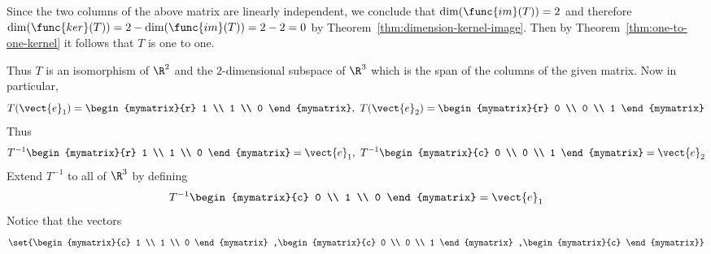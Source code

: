 \begin{solution}
Since the two columns of the above matrix are linearly independent, we conclude that $\dim(\func{im}(T)) = 2$ and therefore $\dim(\func{ker}(T)) = 2 - \dim(\func{im}(T)) = 2-2 = 0$ by Theorem~\ref{thm:dimension-kernel-image}. Then by Theorem~\ref{thm:one-to-one-kernel} it follows that $T$ is one to one.

Thus $T$ is an isomorphism of $\R^{2}$ and the $2$-dimensional subspace of $\R^{3}$ which is the
span of the columns of the given matrix. Now in particular,
\begin{equation*}
T(\vect{e}_{1})=\begin{mymatrix}{r}
1 \\
1 \\
0
\end{mymatrix} ,\ T(\vect{e}_{2})=\begin{mymatrix}{r}
0 \\
0 \\
1
\end{mymatrix}
\end{equation*}
Thus
\begin{equation*}
T^{-1}\begin{mymatrix}{r}
1 \\
1 \\
0
\end{mymatrix} =\vect{e}_{1},\ T^{-1}\begin{mymatrix}{c}
0 \\
0 \\
1
\end{mymatrix} =\vect{e}_{2}
\end{equation*}
Extend $T^{-1}$ to all of $\R^{3}$ by defining
\begin{equation*}
T^{-1}\begin{mymatrix}{c}
0 \\
1 \\
0
\end{mymatrix} =\vect{e}_{1}
\end{equation*}
Notice that the vectors
\begin{equation*}
\set{\begin{mymatrix}{c}
1 \\
1 \\
0
\end{mymatrix} ,\begin{mymatrix}{c}
0 \\
0 \\
1
\end{mymatrix} ,\begin{mymatrix}{c}

\end{mymatrix}}
\end{equation*}
\end{solution}
